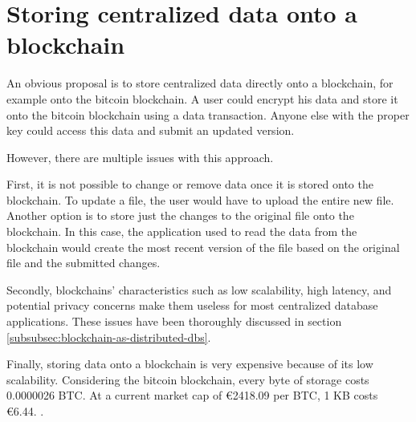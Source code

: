 \section{Storing centralized data onto a blockchain}
\label{store-on-bitcoin}

\iffalse
- very obvious solution would be to store data directly onto a blockchain, eg. the bitcoin blockchain. you would just put all the data, properly encrypted, directly onto the blockchain and it is stored

\fi

An obvious proposal is to store centralized data directly onto a blockchain, for example onto the bitcoin blockchain. A user could encrypt his data and store it onto the bitcoin blockchain using a data transaction. Anyone else with the proper key could access this data and submit an updated version.

\iffalse
- various issues arise: 
  - basic functionality is missing that several applications need: you are not able to change or remove data once stored data, to update a file you would have to store the entire file again or store just the change and have your application reading the blockchain create the most recent file.
  - as mentioned in section \ref{subsubsec:blockchain-as-distributed-dbs}, blockchains deal with low scalability, high latency and potential privacy concerns.
  - insanely expensive: 0.0000026 BTC per byte \cite{bitcoin-transaction-fee}. At a current market cap of €2418.09 per BTC, the cost of storage is €6.44 per KB. \cite{bitcoin-market-cap}
\fi

However, there are multiple issues with this approach. 

First, it is not possible to change or remove data once it is stored onto the blockchain. To update a file, the user would have to upload the entire new file. Another option is to store just the changes to the original file onto the blockchain. In this case, the application used to read the data from the blockchain would create the most recent version of the file based on the original file and the submitted changes. 

Secondly, blockchains' characteristics such as low scalability, high latency, and potential privacy concerns make them useless for most centralized database applications. These issues have been thoroughly discussed in section \ref{subsubsec:blockchain-as-distributed-dbs}.

Finally, storing data onto a blockchain is very expensive because of its low scalability. Considering the bitcoin blockchain, every byte of storage costs 0.0000026 BTC\cite{bitcoin-transaction-fee}. At a current market cap of \euro 2418.09 per BTC, 1 KB costs \euro 6.44. \cite{bitcoin-market-cap}.

